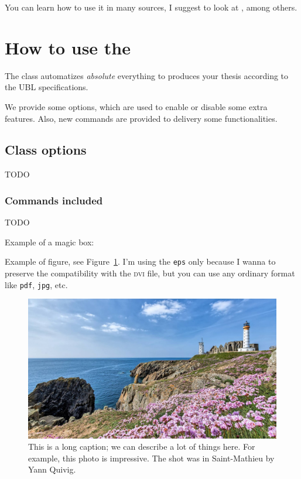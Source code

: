 You can learn how to use it in many sources, I suggest to look at \cite{lamport1994latex}, among others.


\section{How to use the \ublmstic}\label{sec-howtoubl}
The \ublmstic class automatizes \emph{absolute} everything to produces your thesis according to the UBL specifications.

We provide some options, which are used to enable or disable some extra features.
Also, new commands are provided to delivery some functionalities.

\subsection{Class options}
 TODO
 
\subsubsection{Commands included}
TODO


Example of a magic box:
\Blindtext%

Example of figure, see Figure~\ref{fig:test}. I'm using the \texttt{eps} only because   I wanna to preserve the compatibility with the \textsc{dvi} file, but you can use any ordinary format like \texttt{pdf}, \texttt{jpg}, etc.

\begin{figure}[tbh]
	\centering
	\includegraphics[width=0.7\linewidth]{Figures/saint_mathieu_avec_les_armeries_yann_quiviger-3215501}%
	\caption[Short caption goes to List of Figures]{This is a long caption; we can describe a lot of things here. For example, this photo is impressive. The shot was in Saint-Mathieu by Yann Quivig.}%
	\label{fig:test}
\end{figure}


